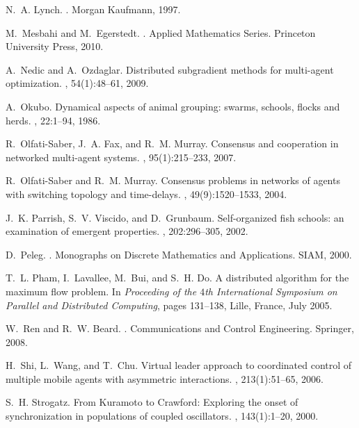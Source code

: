 \documentclass[final]{siamltex}
\begin{document}
\begin{thebibliography}{10}
N.~A. Lynch.
.
\newblock Morgan Kaufmann, 1997.

M.~Mesbahi and M.~Egerstedt.
.
\newblock Applied Mathematics Series. Princeton University Press, 2010.

A.~Nedic and A.~Ozdaglar.
\newblock Distributed subgradient methods for multi-agent optimization.
, 54(1):48--61, 2009.

A.~Okubo.
\newblock Dynamical aspects of animal grouping: swarms, schools, flocks and
  herds.
, 22:1--94, 1986.

R.~Olfati-Saber, J.~A. Fax, and R.~M. Murray.
\newblock Consensus and cooperation in networked multi-agent systems.
, 95(1):215--233, 2007.

R.~Olfati-Saber and R.~M. Murray.
\newblock Consensus problems in networks of agents with switching topology and
  time-delays.
, 49(9):1520--1533, 2004.

J.~K. Parrish, S.~V. Viscido, and D.~Grunbaum.
\newblock Self-organized fish schools: an examination of emergent properties.
, 202:296--305, 2002.

D.~Peleg.
.
\newblock Monographs on Discrete Mathematics and Applications. SIAM, 2000.

T.~L. Pham, I.~Lavallee, M.~Bui, and S.~H. Do.
\newblock A distributed algorithm for the maximum flow problem.
\newblock In {\em Proceeding of the $ 4 $th International Symposium on Parallel
  and Distributed Computing}, pages 131--138, Lille, France, July 2005.

W.~Ren and R.~W. Beard.
.
\newblock Communications and Control Engineering. Springer, 2008.

H.~Shi, L.~Wang, and T.~Chu.
\newblock Virtual leader approach to coordinated control of multiple mobile
  agents with asymmetric interactions.
, 213(1):51--65, 2006.

S.~H. Strogatz.
\newblock From {K}uramoto to {C}rawford: Exploring the onset of synchronization
  in populations of coupled oscillators.
, 143(1):1--20, 2000.


\end{thebibliography}
\end{document}
